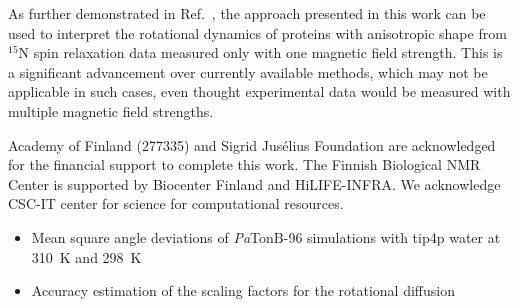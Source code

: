 \documentclass[journal=jpcbfk,manuscript=article]{achemso}
\begin{document}
As further demonstrated in Ref.~, the approach presented in this work can be used to interpret the
rotational dynamics of proteins with anisotropic shape from $^{15}$N
spin relaxation data measured only with one magnetic field strength.
This is a significant advancement over currently available methods,
which may not be applicable in such cases, even thought experimental
data would be measured with multiple magnetic field strengths.


\begin{acknowledgement}
  Academy of Finland (277335) and Sigrid Jus{\' e}lius Foundation are acknowledged for the financial support
  to complete this work. The Finnish Biological NMR Center is supported by Biocenter Finland and HiLIFE-INFRA.
  We acknowledge CSC-IT center for science for computational resources.
\end{acknowledgement}

\begin{suppinfo}


  \begin{itemize}
  \item Mean square angle deviations of {\it Pa}TonB-96 simulations with tip4p water at 310~K and 298~K
  \item Accuracy estimation of the scaling factors for the rotational diffusion
\end{itemize}

\end{suppinfo}


\end{document}
